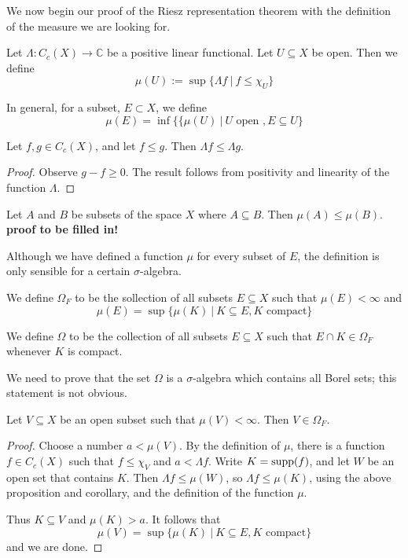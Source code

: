 We now begin our proof of the Riesz representation theorem with the definition of the measure we are looking for.

\begin{definition}
Let $\Lambda \colon C_c (X) \rightarrow {\mathbb C}$ be a positive linear functional.  Let $U\subseteq X$ be open.  Then we define
$$\mu (U):= \sup \{ \Lambda f \ |\ f\leq \chi_U \}$$

In general, for a subset, $E\subset X$, we define
$$\mu (E) = \inf \{ \{ \mu (U) \ |\ U \textrm{ open }, E\subseteq U \}$$
\end{definition}

\begin{proposition}
Let $f,g\in C_c (X)$, and let $f\leq g$.  Then $\Lambda f \leq \Lambda g$.
\end{proposition}

\begin{proof}
Observe $g-f \geq 0$.  The result follows from positivity and linearity of the function $\Lambda$.
\end{proof}

\begin{corollary}
Let $A$ and $B$ be subsets of the space $X$ where $A\subseteq B$.  Then $\mu (A)\leq \mu (B)$.
\textbf{proof to be filled in!}
\end{corollary}

Although we have defined a function $\mu$ for every subset of $E$, the definition is only sensible for a certain $\sigma$-algebra.

\begin{definition}
We define $\Omega_F$ to be the sollection of all subsets $E\subseteq X$ such that $\mu (E)<\infty$ and
$$\mu (E) = \sup \{ \mu (K) \ |\ K\subseteq E, K \textrm{ compact} \}$$

We define $\Omega$ to be the collection of all subsets $E\subseteq X$ such that $E\cap K \in \Omega_F$ whenever $K$ is compact.
\end{definition}

We need to prove that the set $\Omega$ is a $\sigma$-algebra which contains all Borel sets; this statement is not obvious.

\begin{proposition} \label{lem3}
Let $V\subseteq X$ be an open subset such that $\mu (V)<\infty$.  Then $V\in \Omega_F$.
\end{proposition}

\begin{proof}
Choose a number $a< \mu (V)$.  By the definition of $\mu$, there is a function $f\in C_c (X)$ such that $f\leq \chi_V$ and $a< \Lambda f$.  Write $K=\operatorname{supp} (f)$, and let $W$ be an open set that contains $K$.  Then $\Lambda f \leq \mu (W)$, so $\Lambda f \leq \mu (K)$, using the above proposition and corollary, and the definition of the function $\mu$.

Thus $K\subseteq V$ and $\mu (K) >a$.  It follows that
$$\mu (V) = \sup \{ \mu (K) \ |\ K\subseteq E, K \textrm{ compact} \}$$
and we are done.
\end{proof}


